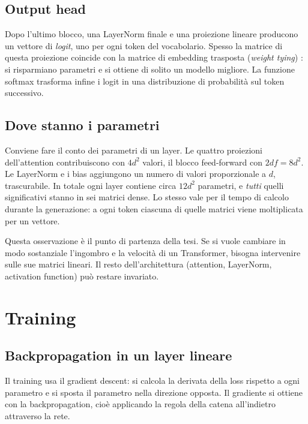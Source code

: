 \subsection{Output head}

Dopo l'ultimo blocco, una LayerNorm finale e una proiezione lineare producono un vettore di \emph{logit}, uno per ogni token del vocabolario. Spesso la matrice di questa proiezione coincide con la matrice di embedding trasposta (\emph{weight tying}) \cite{press2017using}: si risparmiano parametri e si ottiene di solito un modello migliore. La funzione softmax trasforma infine i logit in una distribuzione di probabilità sul token successivo.

\subsection{Dove stanno i parametri}

Conviene fare il conto dei parametri di un layer. Le quattro proiezioni dell'attention contribuiscono con $4d^2$ valori, il blocco feed-forward con $2df=8d^2$. Le LayerNorm e i bias aggiungono un numero di valori proporzionale a $d$, trascurabile. In totale ogni layer contiene circa $12d^2$ parametri, e \emph{tutti} quelli significativi stanno in sei matrici dense. Lo stesso vale per il tempo di calcolo durante la generazione: a ogni token ciascuna di quelle matrici viene moltiplicata per un vettore.

Questa osservazione è il punto di partenza della tesi. Se si vuole cambiare in modo sostanziale l'ingombro e la velocità di un Transformer, bisogna intervenire sulle sue matrici lineari. Il resto dell'architettura (attention, LayerNorm, activation function) può restare invariato.

\section{Training}

\subsection{Backpropagation in un layer lineare}

Il training usa il gradient descent: si calcola la derivata della loss rispetto a ogni parametro e si sposta il parametro nella direzione opposta. Il gradiente si ottiene con la backpropagation, cioè applicando la regola della catena all'indietro attraverso la rete.

